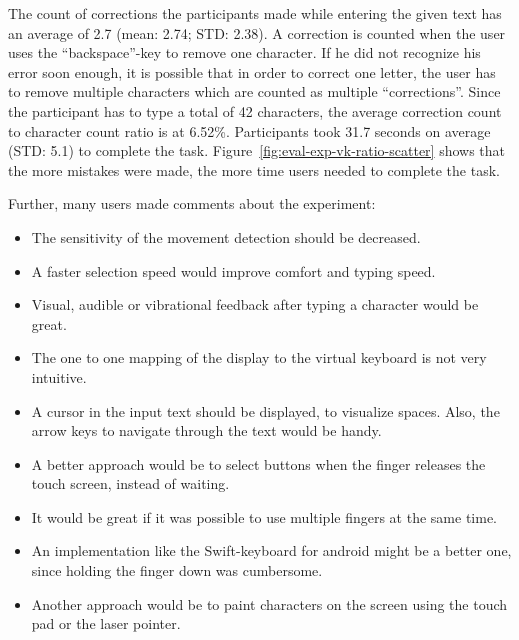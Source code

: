 The count of corrections the participants made while entering the given text has an average of 2.7 (mean: 2.74; \ac{STD}: 2.38). A correction is counted when the user uses the \enquote{backspace}-key to remove one character. If he did not recognize his error soon enough, it is possible that in order to correct one letter, the user has to remove multiple characters which are counted as multiple \enquote{corrections}. Since the participant has to type a total of 42 characters, the average correction count to character count ratio is at 6.52\%.
Participants took 31.7 seconds on average (\ac{STD}: 5.1) to complete the task. Figure~\ref{fig:eval-exp-vk-ratio-scatter} shows that the more mistakes were made, the more time users needed to complete the task.

Further, many users made comments about the experiment:
\begin{itemize}
  \item The sensitivity of the movement detection should be decreased.
  \item A faster selection speed would improve comfort and typing speed.
  \item Visual, audible or vibrational feedback after typing a character would be great.
  \item The one to one mapping of the display to the virtual keyboard is not very intuitive.
  \item A cursor in the input text should be displayed, to visualize spaces. Also, the arrow keys to navigate through the text would be handy.
  \item A better approach would be to select buttons when the finger releases the touch screen, instead of waiting.
  \item It would be great if it was possible to use multiple fingers at the same time.
  \item An implementation like the Swift-keyboard for android might be a better one, since holding the finger down was cumbersome.
  \item Another approach would be to paint characters on the screen using the touch pad or the laser pointer.
\end{itemize}


